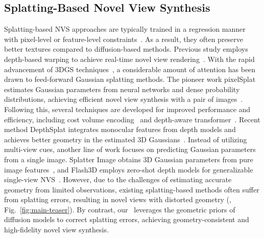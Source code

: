 \subsection{Splatting-Based Novel View Synthesis}
Splatting-based NVS approaches are typically trained in a regression manner with pixel-level or feature-level constraints~\cite{zhang2018lpips}. As a result, they often preserve better textures compared to diffusion-based methods. Previous study employs depth-based warping to achieve real-time novel view rendering~\cite{cao2022fwd}. With the rapid advancement of 3DGS techniques~\cite{kerbl3Dgs}, a considerable amount of attention has been drawn to feed-forward Gaussian splatting methods. The pioneer work pixelSplat estimates Gaussian parameters from neural networks and dense probability distributions, achieving efficient novel view synthesis with a pair of images~\cite{charatan2024pixelsplat}. Following this, several techniques are developed for improved performance and efficiency, including cost volume encoding~\cite{chen2025mvsplat} and depth-aware transformer~\cite{zhang2024transplat}. Recent method DepthSplat integrates monocular features from depth models and achieves better geometry in the estimated 3D Gaussians~\cite{xu2024depthsplat}. Instead of utilizing multi-view cues, another line of work focuses on predicting Gaussian parameters from a single image. Splatter Image obtains 3D Gaussian parameters from pure image features~\cite{szymanowicz2024splatterimage}, and Flash3D employs zero-shot depth models for generalizable single-view NVS~\cite{szymanowicz2024flash3d}. 
However, due to the challenges of estimating accurate geometry from limited observations, existing splatting-based methods often suffer from splatting errors, resulting in novel views with distorted geometry (\eg, Fig.~\ref{fig:main-teaser}). By contrast, our \method\ leverages the geometric priors of diffusion models to correct splatting errors, achieving geometry-consistent and high-fidelity novel view synthesis.



